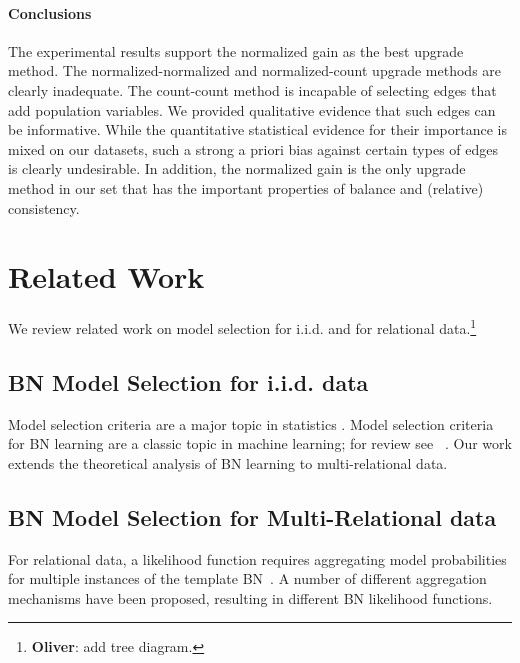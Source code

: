 \documentclass[letterpaper]{article}
\begin{document}
%




\paragraph{Conclusions} The experimental results support the normalized gain as the best upgrade method. The normalized-normalized and normalized-count upgrade methods are clearly inadequate. The count-count method is incapable of selecting edges that add population variables. We provided qualitative evidence that such edges can be informative. While the quantitative statistical evidence for their importance is mixed on our datasets, such a strong a priori bias against certain types of edges is clearly undesirable. In addition, the normalized gain is the only upgrade method in our set that has the important properties of balance and (relative) consistency. 


\section{Related Work} \label{sec:related}


We review related work on model selection for i.i.d. and for relational data.\footnote{\textbf{Oliver}: add tree diagram.}

\subsection{BN Model Selection for i.i.d. data}

Model selection criteria are a major topic in statistics \cite{Williams2001}. Model selection criteria for BN learning are a classic topic in machine learning; for review see~%
\cite{bouckaert95:_bayes}.
Our work extends the theoretical analysis of BN learning to multi-relational data. 


\subsection{BN Model Selection for Multi-Relational data} 
For relational data, a likelihood function requires aggregating model probabilities for multiple instances of the template BN~\cite{Kimmig2014}. A number of different aggregation mechanisms have been proposed, resulting in different BN likelihood functions. 
\end{document}
